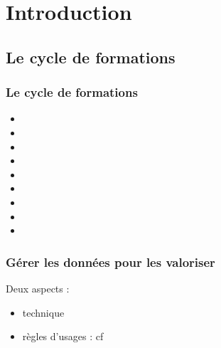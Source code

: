 \section{Introduction} \begin{frame}\small\tableofcontents[currentsection,currentsubsection,subsectionstyle=show/show/hide]\end{frame}



\subsection{Le cycle de formations}

\begin{frame}
\frametitle{Le cycle de formations}

\begin{itemize}

\item \formationA
\item \formationB
\item \formationC
\item \formationD
\item \formationE
\item \yo{\formationFa}
\item \formationFb
\item \formationG
\item \formationH

\end{itemize}

\end{frame}



\begin{frame}
\frametitle{Gérer les données pour les valoriser}

Deux aspects : 
\begin{itemize}
\item technique
\item règles d'usages : cf \yo{\formationFb}
\end{itemize}

\end{frame}

